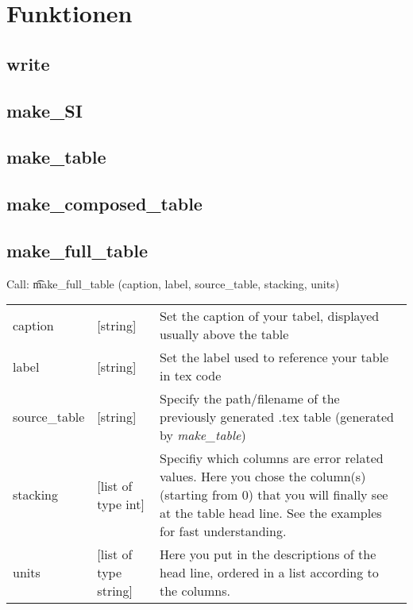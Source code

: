 \section{Funktionen}
\subsection{write}
\subsection{make\_SI}
\subsection{make\_table}
\subsection{make\_composed\_table}
\subsection{make\_full\_table}
Call: \t make\_full\_table (caption, label, source\_table, stacking, units)
\begin{table}
  \centering
  \begin{tabular}{l l p{}}
    caption   & [string]  & Set the caption of your tabel, displayed usually above the table\\
    label     & [string]  & Set the label used to reference your table in tex code\\
    source\_table & [string]  & Specify the path/filename of the previously generated .tex table (generated by \emph{make\_table}) \\
    stacking  & [list of type int]  & Specifiy which columns are error related values. Here you chose the column(s) (starting from 0) that you will finally see at the table head line. See the examples for fast understanding.\\
    units     & [list of type string] & Here you put in the descriptions of the head line, ordered in a list according to the columns.\\
  \end{tabular}
\end{table}
